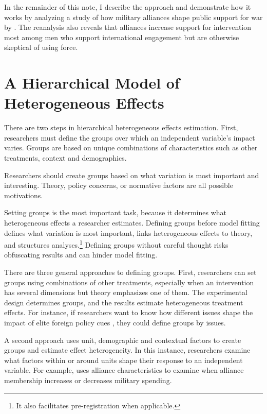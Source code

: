 \documentclass[12pt]{article}
\begin{document}
In the remainder of this note, I describe the approach and demonstrate how it works by analyzing a study of how military alliances shape public support for war by \citet{TomzWeeks2021}. 
The reanalysis also reveals that alliances increase support for intervention most among men who support international engagement but are otherwise skeptical of using force. 



\section{A Hierarchical Model of Heterogeneous Effects}


There are two steps in hierarchical heterogeneous effects estimation. 
First, researchers must define the groups over which an independent variable's impact varies. 
Groups are based on unique combinations of characteristics such as other treatments, context and demographics.


Researchers should create groups based on what variation is most important and interesting. 
Theory, policy concerns, or normative factors are all possible motivations. 


Setting groups is the most important task, because it determines what heterogeneous effects a researcher estimates. 
Defining groups before model fitting defines what variation is most important, links heterogeneous effects to theory, and structures analyses.\footnote{It also facilitates pre-registration when applicable.}
Defining groups without careful thought risks obfuscating results and can hinder model fitting.   


There are three general approaches to defining groups.  
First, researchers can set groups using combinations of other treatments, especially when an intervention has several dimensions but theory emphasizes one of them. 
The experimental design determines groups, and the results estimate heterogeneous treatment effects.   
For instance, if researchers want to know how different issues shape the impact of elite foreign policy cues \citep{GuisingerSaunders2017}, they could define groups by issues. 


A second approach uses unit, demographic and contextual factors to create groups and estimate  effect heterogeneity. 
In this instance, researchers examine what factors within or around units shape their response to an independent variable.
For example, \citet{Alley2021isq} uses alliance characteristics to examine when alliance membership increases or decreases military spending.
\end{document}
